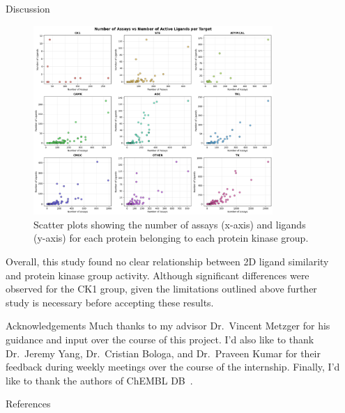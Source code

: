 \documentclass[final]{beamer}
\newlength{\sepwidth}
\newlength{\colwidth}
\newcommand{\separatorcolumn}{\begin{column}{\sepwidth}\end{column}}
\begin{document}
\begin{frame}[t]
\begin{columns}[t]
\begin{column}{\colwidth}
\begin{block}{Discussion}
    \begin{figure}
        \centering
        \includegraphics[width=0.85\textwidth]{../figures/assay_vs_ligand.png}
        \caption{Scatter plots showing the number of assays (x-axis) and ligands (y-axis) for each protein belonging to each protein kinase group.}
        \label{assay_vs_ligand_plot}
    \end{figure}

      \small
      Overall, this study found no clear relationship between 2D ligand similarity and protein kinase group activity. Although significant differences were observed for the CK1 group, given the limitations outlined above further study is necessary before accepting these results. 
  \end{block}

  \begin{block}{Acknowledgements}
  \small{
    Much thanks to my advisor Dr.~Vincent Metzger for his guidance and input over the course of this project. I'd also like to thank Dr.~Jeremy Yang, Dr.~Cristian Bologa, and Dr.~Praveen Kumar for their feedback during weekly meetings over the course of the internship. Finally, I'd like to thank the   authors of ChEMBL DB~\cite{chembl_db_2023}.}
  \end{block}

  \begin{block}{References}
    \tiny{}
  \end{block}

\end{column}

\separatorcolumn
\end{columns}
\end{frame}
\end{document}
